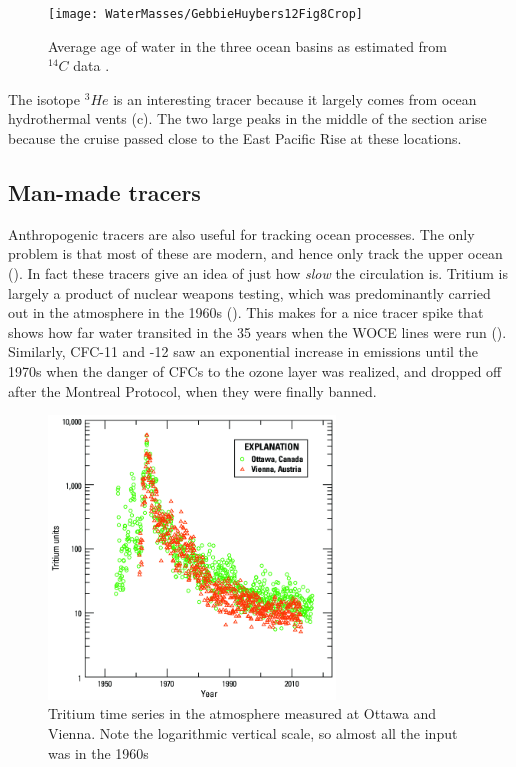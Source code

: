 \begin{figure}[hbt]
  \begin{center}
    \texttt{[image: WaterMasses/GebbieHuybers12Fig8Crop]}
    \caption{Average age of water in the three ocean basins as estimated from $^{14}C$ data \citep{gebbiehuybers12}.}
    \label{fig:GebbieHuybers12Fig8}  
  \end{center}
\end{figure}

The isotope $^3He$ is an interesting tracer because it largely comes from ocean hydrothermal vents (c).  The two large peaks in the middle of the section arise because the cruise passed close to the East Pacific Rise at these locations.  


\clearpage
\subsection{Man-made tracers}

Anthropogenic tracers are also useful for tracking ocean processes.  The only problem is that most of these are modern, and hence only track the upper ocean ().  In fact these tracers give an idea of just how \emph{slow} the circulation is.  Tritium is largely a product of nuclear weapons testing, which was predominantly carried out in the atmosphere in the 1960s ().  This makes for a nice tracer spike that shows how far water transited in the 35 years when  the WOCE lines were run ().  Similarly, CFC-11 and -12 saw an exponential increase in emissions until the 1970s when the danger of CFCs to the ozone layer was realized, and dropped off after the Montreal Protocol, when they were finally banned.  

\begin{figure}[hbt]
  \begin{center}
    \includegraphics[width=3in]{figs/WaterMasses/TritiumOttawa}
    \caption{Tritium time series in the atmosphere measured at Ottawa and Vienna.  Note the logarithmic vertical scale, so almost all the input was in the 1960s}
    \label{fig:TritiumOttawa}  
  \end{center}
\end{figure}

